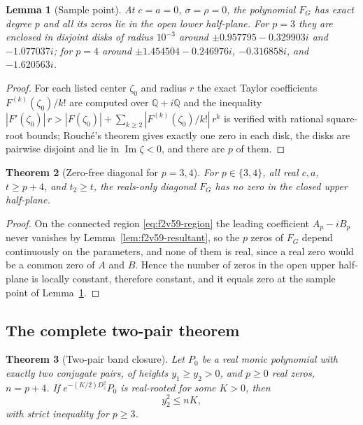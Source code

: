 \documentclass[11pt]{article}
\newtheorem{theorem}{Theorem}[section]
\newtheorem{lemma}[theorem]{Lemma}
\theoremstyle{definition}
\theoremstyle{remark}
\begin{document}
\begin{lemma}[Sample point]
\label{lem:f2v59-sample}
At \(c=a=0\), \(\sigma=\rho=0\), the polynomial \(F_G\) has exact
degree \(p\) and all its zeros lie in the open lower half-plane.  For
\(p=3\) they are enclosed in disjoint disks of radius \(10^{-3}\) around
\(\pm0.957795-0.329903i\) and \(-1.077037i\); for \(p=4\) around
\(\pm1.454504-0.246976i\), \(-0.316858i\), and \(-1.620563i\).
\end{lemma}

\begin{proof}
For each listed center \(\zeta_0\) and radius \(r\) the exact Taylor
coefficients \(F^{(k)}(\zeta_0)/k!\) are computed over
\(\mathbb Q+i\mathbb Q\) and the inequality
\(|F'(\zeta_0)|\,r>|F(\zeta_0)|+\sum_{k\ge2}|F^{(k)}(\zeta_0)/k!|\,r^k\)
is verified with rational square-root bounds; Rouch\'{e}'s theorem
gives exactly one zero in each disk, the disks are pairwise disjoint and
lie in \(\operatorname{Im}\zeta<0\), and there are \(p\) of them.
\end{proof}

\begin{theorem}[Zero-free diagonal for \(p=3,4\)]
\label{thm:f2v59-zero-free}
For \(p\in\{3,4\}\), all real \(c,a\), \(t\ge p+4\), and \(t_2\ge t\),
the reals-only diagonal \(F_G\) has no zero in the closed upper
half-plane.
\end{theorem}

\begin{proof}
On the connected region \eqref{eq:f2v59-region} the leading coefficient
\(A_p-iB_p\) never vanishes by Lemma~\ref{lem:f2v59-resultant}, so the
\(p\) zeros of \(F_G\) depend continuously on the parameters, and none
of them is real, since a real zero would be a common zero of \(A\) and
\(B\).  Hence the number of zeros in the open upper half-plane is locally
constant, therefore constant, and it equals zero at the sample point of
Lemma~\ref{lem:f2v59-sample}.
\end{proof}

\subsection{The complete two-pair theorem}

\begin{theorem}[Two-pair band closure]
\label{thm:f2v59-band}
Let \(P_0\) be a real monic polynomial with exactly two conjugate pairs,
of heights \(y_1\ge y_2>0\), and \(p\ge0\) real zeros, \(n=p+4\).  If
\(e^{-(K/2)D_z^2}P_0\) is real-rooted for some \(K>0\), then
\begin{equation}
 \boxed{\;y_2^2\le nK,\;}
 \label{eq:f2v59-bound}
\end{equation}
with strict inequality for \(p\ge3\).
\end{theorem}
\end{document}
